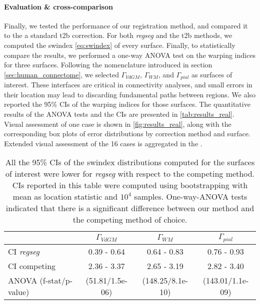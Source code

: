 \paragraph*{Evaluation \& cross-comparison}\label{sec:res_cc_evaluation}
%
Finally, we tested the performance of our registration method, and compared it to the
  a standard \gls*{t2b} correction.
For both \emph{regseg} and the \gls*{t2b} methods, we computed the \gls*{swindex} \eqref{eq:swindex}
  of every surface.
Finally, to statistically compare the results, we performed a one-way ANOVA test
  on the warping indices for three surfaces.
Following the nomenclature introduced in section \autoref{sec:human_connectome}, we selected
  $\Gamma_{VdGM}$, $\Gamma_{WM}$, and $\Gamma_{pial}$ as surfaces of interest.
These interfaces are critical in connectivity analyses, and small errors in their location may
  lead to discarding fundamental paths between regions.
We also reported the 95\% CIs of the warping indices for those surfaces.
The quantitative results of the ANOVA tests and the CIs are presented in \autoref{tab:results_real}.
Visual assessment of one case is shown in \autoref{fig:results_real}, along with the corresponding
  box plots of error distributions by correction method and surface.
Extended visual assessment of the 16 cases is aggregated in the .

\begin{table}
		\centering
		\footnotesize
		\tabcolsep=0.05cm
    \begin{tabular}{L{1.8cm}ccc}
                            & $\Gamma_{VdGM}$  & $\Gamma_{WM}$ & $\Gamma_{pial}$ \\
    \hline
    CI \emph{regseg}        & 0.39 - 0.64 & 0.64 - 0.83 & 0.76 - 0.93 \\
    CI competing            & 2.36 - 3.37 & 2.65 - 3.19 & 2.82 - 3.40 \\
    \hline
    ANOVA (f-stat/p-value)  & (51.81/1.5e-06) & (148.25/8.1e-10) & (143.01/1.1e-09) \\
    \hline
    \end{tabular}
    \caption{All the 95\% CIs of the \gls*{swindex} distributions computed for the
      surfaces of interest were lower for \emph{regseg} with respect to the competing
      method.
    CIs reported in this table were computed using bootstrapping with mean as location
      statistic and $10^4$ samples.
    One-way-ANOVA tests indicated that there is a significant difference between our method and
      the competing method of choice.
    }\label{tab:results_real}
\end{table}

